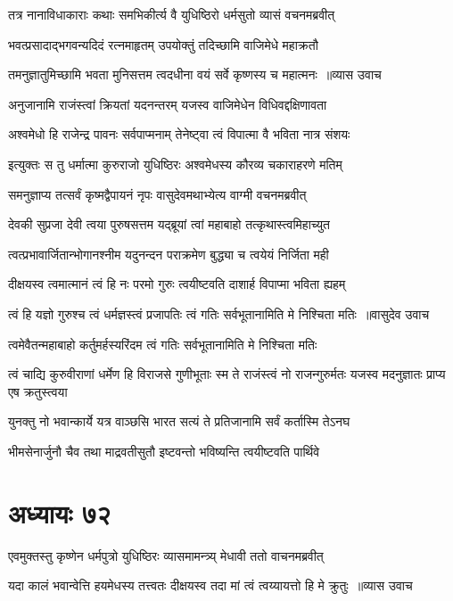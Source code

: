 \twolineshloka
{तत्र नानाविधाकाराः कथाः समभिकीर्त्य वै}
{युधिष्ठिरो धर्मसुतो व्यासं वचनमब्रवीत्}


\twolineshloka
{भवत्प्रसादाद्भगवन्यदिदं रत्नमाहृतम्}
{उपयोक्तुं तदिच्छामि वाजिमेधे महाक्रतौ}


\threelineshloka
{तमनुज्ञातुमिच्छामि भवता मुनिसत्तम}
{त्वदधीना वयं सर्वे कृष्णस्य च महात्मनः ॥व्यास उवाच}
{}


\twolineshloka
{अनुजानामि राजंस्त्वां क्रियतां यदनन्तरम्}
{यजस्व वाजिमेधेन विधिवद्दक्षिणावता}


\twolineshloka
{अश्वमेधो हि राजेन्द्र पावनः सर्वपाप्मनाम्}
{तेनेष्ट्वा त्वं विपात्मा वै भविता नात्र संशयः}


\twolineshloka
{इत्युक्तः स तु धर्मात्मा कुरुराजो युधिष्ठिरः}
{अश्वमेधस्य कौरव्य चकाराहरणे मतिम्}


\twolineshloka
{समनुज्ञाप्य तत्सर्वं कृष्मद्वैपायनं नृपः}
{वासुदेवमथाभ्येत्य वाग्मी वचनमब्रवीत्}


\twolineshloka
{देवकी सुप्रजा देवी त्वया पुरुषसत्तम}
{यद्ब्रूयां त्वां महाबाहो तत्कृथास्त्वमिहाच्युत}


\twolineshloka
{त्वत्प्रभावार्जितान्भोगानश्नीम यदुनन्दन}
{पराक्रमेण बुद्ध्या च त्वयेयं निर्जिता मही}


\twolineshloka
{दीक्षयस्व त्वमात्मानं त्वं हि नः परमो गुरुः}
{त्वयीष्टवति दाशार्ह विपाप्मा भविता ह्यहम्}


\threelineshloka
{त्वं हि यज्ञो गुरुश्च त्वं धर्मज्ञस्त्वं प्रजापतिः}
{त्वं गतिः सर्वभूतानामिति मे निश्चिता मतिः ॥वासुदेव उवाच}
{}


\twolineshloka
{त्वमेवैतन्महाबाहो कर्तुमर्हस्यरिंदम}
{त्वं गतिः सर्वभूतानामिति मे निश्चिता मतिः}


\threelineshloka
{त्वं चाद्यि कुरुवीराणां धर्मेण हि विराजसे}
{गुणीभूताः स्म ते राजंस्त्वं नो राजन्गुरुर्मतः}
{यजस्व मदनुज्ञातः प्राप्य एष क्रतुस्त्वया}


\twolineshloka
{युनक्तु नो भवान्कार्ये यत्र वाञ्छसि भारत}
{सत्यं ते प्रतिजानामि सर्वं कर्तास्मि तेऽनघ}


\twolineshloka
{भीमसेनार्जुनौ चैव तथा माद्रवतीसुतौ}
{इष्टवन्तो भविष्यन्ति त्वयीष्टवति पार्थिवे}


\chapter{अध्यायः ७२}
\twolineshloka
{एवमुक्तस्तु कृष्णेन धर्मपुत्रो युधिष्ठिरः}
{व्यासमामन्त्र्य् मेधावी ततो वाचनमब्रवीत्}


\threelineshloka
{यदा कालं भवान्वेत्ति हयमेधस्य तत्त्वतः}
{दीक्षयस्व तदा मां त्वं त्वय्यायत्तो हि मे क्रुतुः ॥व्यास उवाच}
{}


